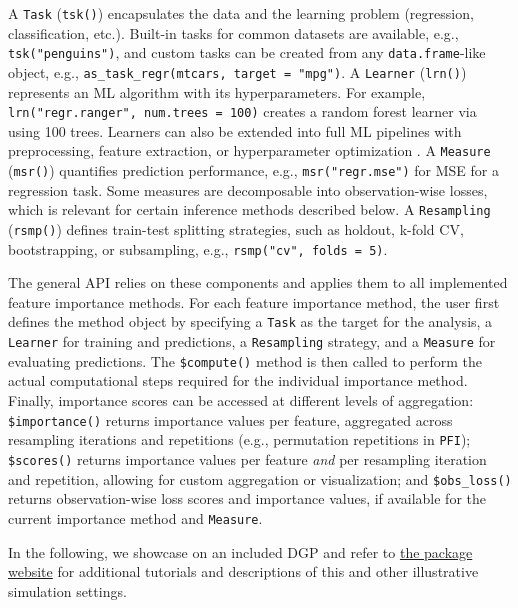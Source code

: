 A \texttt{Task} (\texttt{tsk()}) encapsulates the data and the learning problem (regression, classification, etc.).
Built-in tasks for common datasets are available, e.g., \texttt{tsk("penguins")}, and custom tasks can be created from any \texttt{data.frame}-like object, e.g., \texttt{as\_task\_regr(mtcars,\ target\ =\ "mpg")}.
A \texttt{Learner} (\texttt{lrn()}) represents an ML algorithm with its hyperparameters.
For example, \texttt{lrn("regr.ranger",\ num.trees\ =\ 100)} creates a random forest learner via  using 100 trees.
Learners can also be extended into full ML pipelines with preprocessing, feature extraction, or hyperparameter optimization \citep[see][\citet{mlr3booktuning}, \citet{binder2021mlr3pipelinesflexible}]{mlr3bookpreprocessing}.
A \texttt{Measure} (\texttt{msr()}) quantifies prediction performance, e.g., \texttt{msr("regr.mse")} for MSE for a regression task.
Some measures are decomposable into observation-wise losses, which is relevant for certain inference methods described below.
A \texttt{Resampling} (\texttt{rsmp()}) defines train-test splitting strategies, such as holdout, k-fold CV, bootstrapping, or subsampling, e.g., \texttt{rsmp("cv",\ folds\ =\ 5)}.

The general  API relies on these components and applies them to all implemented feature importance methods.
For each feature importance method, the user first defines the method object by specifying a \texttt{Task} as the target for the analysis, a \texttt{Learner} for training and predictions, a \texttt{Resampling} strategy, and a \texttt{Measure} for evaluating predictions.
The \texttt{\$compute()} method is then called to perform the actual computational steps required for the individual importance method.
Finally, importance scores can be accessed at different levels of aggregation:
\texttt{\$importance()} returns importance values per feature, aggregated across resampling iterations and repetitions (e.g., permutation repetitions in \texttt{PFI});
\texttt{\$scores()} returns importance values per feature \emph{and} per resampling iteration and repetition, allowing for custom aggregation or visualization;
and \texttt{\$obs\_loss()} returns observation-wise loss scores and importance values, if available for the current importance method and \texttt{Measure}.

In the following, we showcase  on an included DGP and refer to \href{https://mlr-org.github.io/xplainfi/}{the package website} for additional tutorials and descriptions of this and other illustrative simulation settings.

